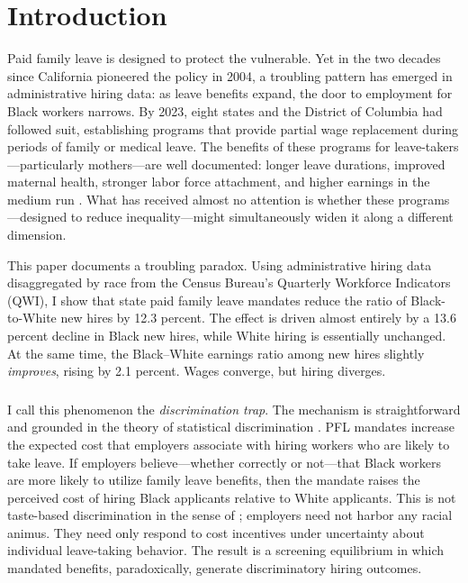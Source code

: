 \documentclass[12pt]{article}
\begin{document}
\section{Introduction}

Paid family leave is designed to protect the vulnerable. Yet in the two decades since California pioneered the policy in 2004, a troubling pattern has emerged in administrative hiring data: as leave benefits expand, the door to employment for Black workers narrows. By 2023, eight states and the District of Columbia had followed suit, establishing programs that provide partial wage replacement during periods of family or medical leave. The benefits of these programs for leave-takers---particularly mothers---are well documented: longer leave durations, improved maternal health, stronger labor force attachment, and higher earnings in the medium run \citep{rossinslater2013, baum2016, byker2016}. What has received almost no attention is whether these programs---designed to reduce inequality---might simultaneously widen it along a different dimension.

This paper documents a troubling paradox. Using administrative hiring data disaggregated by race from the Census Bureau's Quarterly Workforce Indicators (QWI), I show that state paid family leave mandates reduce the ratio of Black-to-White new hires by 12.3 percent. The effect is driven almost entirely by a 13.6 percent decline in Black new hires, while White hiring is essentially unchanged. At the same time, the Black--White earnings ratio among new hires slightly \textit{improves}, rising by 2.1 percent. Wages converge, but hiring diverges.

\subsubsection*{}
I call this phenomenon the \textit{discrimination trap}. The mechanism is straightforward and grounded in the theory of statistical discrimination \citep{phelps1972, arrow1973}. PFL mandates increase the expected cost that employers associate with hiring workers who are likely to take leave. If employers believe---whether correctly or not---that Black workers are more likely to utilize family leave benefits, then the mandate raises the perceived cost of hiring Black applicants relative to White applicants. This is not taste-based discrimination in the sense of \citet{becker1957}; employers need not harbor any racial animus. They need only respond to cost incentives under uncertainty about individual leave-taking behavior. The result is a screening equilibrium in which mandated benefits, paradoxically, generate discriminatory hiring outcomes.
\end{document}
